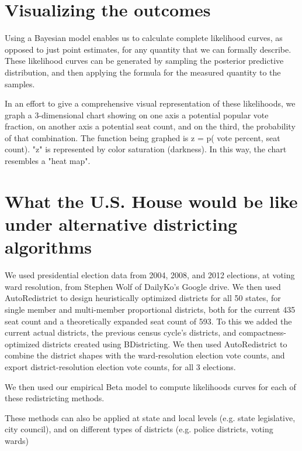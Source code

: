 \documentclass[preprint,12pt]{article}
\begin{document}
\clearpage

\section{Visualizing the outcomes}

Using a Bayesian model enables us to calculate complete likelihood curves, as opposed to just point estimates, for any quantity that we can formally describe.  These likelihood curves can be generated by sampling the posterior predictive distribution, and then applying the formula for the measured quantity to the samples.

In an effort to give a comprehensive visual representation of these likelihoods, we graph a 3-dimensional chart showing on one axis a potential popular vote fraction, on another axis a potential seat count, and on the third, the probability of that combination.  The function being graphed is z = p( vote percent, seat count). "z" is represented by color saturation (darkness).  In this way, the chart resembles a "heat map".

\section{What the U.S. House would be like under alternative districting algorithms}

We used presidential election data from 2004, 2008, and 2012 elections, at voting ward resolution, from Stephen Wolf of DailyKo's Google drive.  We then used AutoRedistrict to design heuristically optimized districts for all 50 states, for single member and multi-member proportional districts, both for the current 435 seat count and a theoretically expanded seat count of 593.  To this we added the current actual districts, the previous census cycle's districts, and compactness-optimized districts created using BDistricting.   We then used AutoRedistrict to combine the district shapes with the ward-resolution election vote counts, and export district-resolution election vote counts, for all 3 elections.

We then used our empirical Beta model to compute likelihoods curves for each of these redistricting methods. 

These methods can also be applied at state and local levels (e.g. state legislative, city council), and on different types of districts (e.g. police districts, voting wards)
\end{document}
